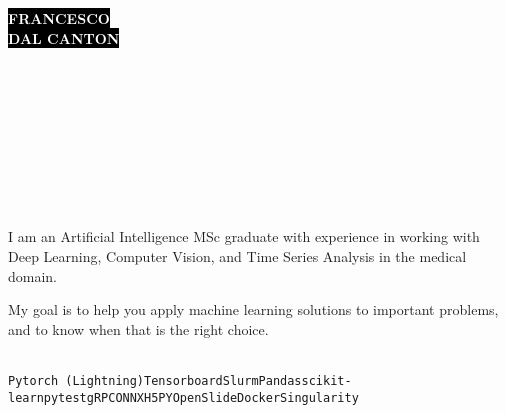 \documentclass[9pt]{developercv}
\begin{document}

\begin{minipage}[t]{0.45\textwidth}
    \vspace{-\baselineskip}
    \colorbox{black}{{\fontsize{26}{0}\textcolor{white}{\textbf{\MakeUppercase{Francesco}}}}}\\    
    \colorbox{black}{{\fontsize{26}{0}\textcolor{white}{\textbf{\MakeUppercase{Dal Canton}}}}}\\
\end{minipage}
\begin{minipage}[t]{0.27\textwidth}
    \vspace{-\baselineskip}
    \\
    \\
    \\
\end{minipage}
\begin{minipage}[t]{0.28\textwidth}
    \vspace{-\baselineskip}
    \\
    \\
    \\
\end{minipage}

\vspace{1.5cm}


\begin{minipage}[t]{0.45\textwidth}
    \vspace{-\baselineskip}
    \\
    I am an Artificial Intelligence MSc graduate with experience in working with Deep Learning, Computer Vision, and Time Series Analysis in the medical domain.
    
    My goal is to help you apply machine learning solutions to important problems, and to know when that is the right choice.
\end{minipage}
\hfill
\begin{minipage}[t]{0.45\textwidth}
    \vspace{-\baselineskip}
    \\
    \texttt{Pytorch (Lightning)}\slashsep\texttt{Tensorboard}\slashsep\texttt{Slurm}\slashsep\texttt{Pandas}\slashsep\texttt{scikit-learn}\slashsep\texttt{pytest}\slashsep\texttt{gRPC}\slashsep\texttt{ONNX}\slashsep\texttt{H5PY}\slashsep\texttt{OpenSlide}\slashsep\texttt{Docker}\slashsep\texttt{Singularity}
\end{minipage}
\end{document}
